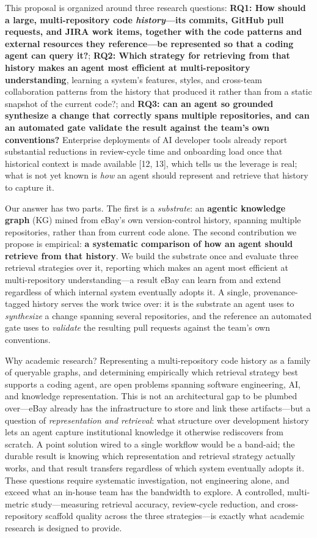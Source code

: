 \documentclass[11pt, letterpaper]{article}
\begin{document}
This proposal is organized around three research questions: \textbf{RQ1: How should a large, multi-repository code \emph{history}---its commits, GitHub pull requests, and JIRA work items, together with the code patterns and external resources they reference---be represented so that a coding agent can query it?}; \textbf{RQ2: Which strategy for retrieving from that history makes an agent most efficient at multi-repository understanding}, learning a system's features, styles, and cross-team collaboration patterns from the history that produced it rather than from a static snapshot of the current code?; and \textbf{RQ3: can an agent so grounded synthesize a change that correctly spans multiple repositories, and can an automated gate validate the result against the team's own conventions?} Enterprise deployments of AI developer tools already report substantial reductions in review-cycle time and onboarding load once that historical context is made available [12, 13], which tells us the leverage is real; what is not yet known is \emph{how} an agent should represent and retrieve that history to capture it.

Our answer has two parts. The first is a \emph{substrate}: an \textbf{agentic knowledge graph} (KG) mined from eBay's own version-control history, spanning multiple repositories, rather than from current code alone. The second contribution we propose is empirical: \textbf{a systematic comparison of how an agent should retrieve from that history}. We build the substrate once and evaluate three retrieval strategies over it, reporting which makes an agent most efficient at multi-repository understanding---a result eBay can learn from and extend regardless of which internal system eventually adopts it. A single, provenance-tagged history serves the work twice over: it is the substrate an agent uses to \emph{synthesize} a change spanning several repositories, and the reference an automated gate uses to \emph{validate} the resulting pull requests against the team's own conventions.

Why academic research? Representing a multi-repository code history as a family of queryable graphs, and determining empirically which retrieval strategy best supports a coding agent, are open problems spanning software engineering, AI, and knowledge representation. This is not an architectural gap to be plumbed over---eBay already has the infrastructure to store and link these artifacts---but a question of \emph{representation and retrieval}: what structure over development history lets an agent capture institutional knowledge it otherwise rediscovers from scratch. A point solution wired to a single workflow would be a band-aid; the durable result is knowing which representation and retrieval strategy actually works, and that result transfers regardless of which system eventually adopts it. These questions require systematic investigation, not engineering alone, and exceed what an in-house team has the bandwidth to explore. A controlled, multi-metric study---measuring retrieval accuracy, review-cycle reduction, and cross-repository scaffold quality across the three strategies---is exactly what academic research is designed to provide.
\end{document}
